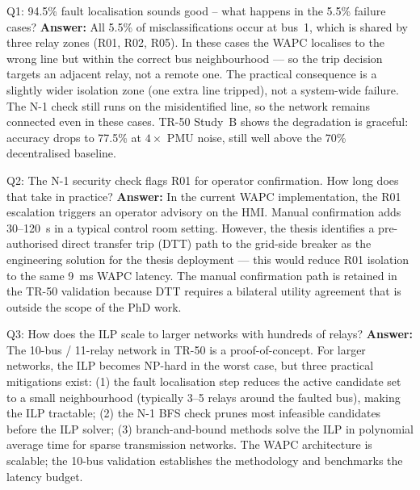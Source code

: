 \documentclass[12pt,a4paper]{article}
\begin{document}
\begin{keybox}{Q1: 94.5\% fault localisation sounds good -- what happens in the 5.5\% failure cases?}
\textbf{Answer:} All 5.5\% of misclassifications occur at bus~1, which is shared by three relay zones (R01, R02, R05). In these cases the WAPC localises to the wrong line but within the correct bus neighbourhood — so the trip decision targets an adjacent relay, not a remote one. The practical consequence is a slightly wider isolation zone (one extra line tripped), not a system-wide failure. The N-1 check still runs on the misidentified line, so the network remains connected even in these cases. TR-50 Study~B shows the degradation is graceful: accuracy drops to 77.5\% at $4\times$ PMU noise, still well above the 70\% decentralised baseline.
\end{keybox}

\begin{keybox}{Q2: The N-1 security check flags R01 for operator confirmation. How long does that take in practice?}
\textbf{Answer:} In the current WAPC implementation, the R01 escalation triggers an operator advisory on the HMI. Manual confirmation adds 30--120~s in a typical control room setting. However, the thesis identifies a pre-authorised direct transfer trip (DTT) path to the grid-side breaker as the engineering solution for the thesis deployment — this would reduce R01 isolation to the same 9~ms WAPC latency. The manual confirmation path is retained in the TR-50 validation because DTT requires a bilateral utility agreement that is outside the scope of the PhD work.
\end{keybox}

\begin{keybox}{Q3: How does the ILP scale to larger networks with hundreds of relays?}
\textbf{Answer:} The 10-bus / 11-relay network in TR-50 is a proof-of-concept. For larger networks, the ILP becomes NP-hard in the worst case, but three practical mitigations exist: (1) the fault localisation step reduces the active candidate set to a small neighbourhood (typically 3--5 relays around the faulted bus), making the ILP tractable; (2) the N-1 BFS check prunes most infeasible candidates before the ILP solver; (3) branch-and-bound methods solve the ILP in polynomial average time for sparse transmission networks. The WAPC architecture is scalable; the 10-bus validation establishes the methodology and benchmarks the latency budget.
\end{keybox}
\end{document}
